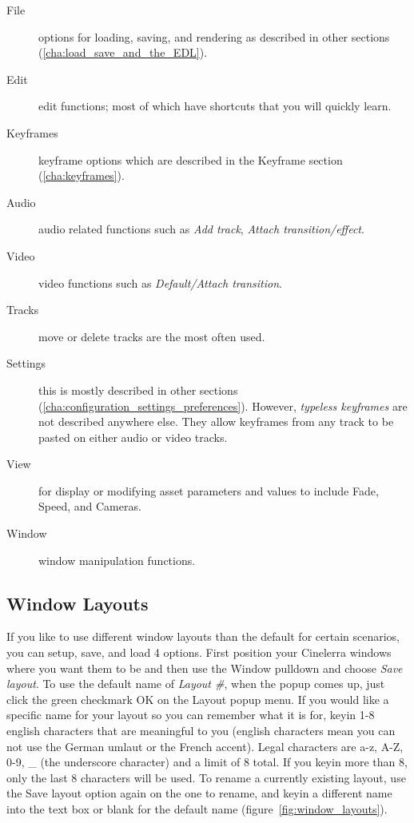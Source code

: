 \begin{description}
    \item[File]  options for loading, saving, and rendering as described in other sections (\ref{cha:load_save_and_the_EDL}).
    \item[Edit]  edit functions; most of which have shortcuts that you will quickly learn.
    \item[Keyframes]  keyframe options which are described in the Keyframe section (\ref{cha:keyframes}).
    \item[Audio]  audio related functions such as \textit{Add track}, \textit{Attach transition/effect}.
    \item[Video]  video functions such as \textit{Default/Attach transition}.
    \item[Tracks]  move or delete tracks are the most often used.
    \item[Settings]  this is mostly described in other sections (\ref{cha:configuration_settings_preferences}).  
        However, \textit{typeless keyframes} are not described anywhere else.  
        They allow keyframes from any track to be pasted on either audio or video tracks.
    \item[View]  for display or modifying asset parameters and values to include Fade, Speed, and Cameras.
    \item[Window]  window manipulation functions.
\end{description}


\subsection{Window Layouts}%
\label{sub:window_layouts}

If you like to use different window layouts than the default for certain scenarios, you can setup, save, and load 4 options.   
First position your Cinelerra windows where you want them to be and then use the Window pulldown and choose \emph{Save layout}.  
To use the default name of \textit{Layout \#}, when the popup comes up, just click the green checkmark OK on the Layout popup menu.  
If you would like a specific name for your layout so you can remember what it is for, keyin 1-8 english characters that are meaningful to you (english characters mean you can not use the German umlaut or the French accent).  
Legal characters are a-z, A-Z, 0-9, \_ (the underscore character) and a limit of 8 total.  
If you keyin more than 8, only the last 8 characters will be used.  
To rename a currently existing layout, use the Save layout option again on the one to rename, and keyin a different name into the text box or blank for the default name (figure~\ref{fig:window_layouts}).

